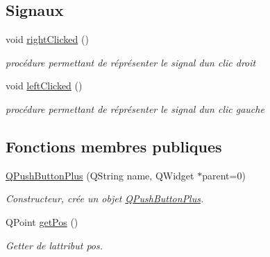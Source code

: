 \subsection*{Signaux}
\begin{DoxyCompactItemize}
\item 
void \hyperlink{class_q_push_button_plus_a8c120f8c9b33c2cd0d6282bc570559f3}{right\+Clicked} ()\hypertarget{class_q_push_button_plus_a8c120f8c9b33c2cd0d6282bc570559f3}{}\label{class_q_push_button_plus_a8c120f8c9b33c2cd0d6282bc570559f3}

\begin{DoxyCompactList}\small\item\em procédure permettant de réprésenter le signal d\textquotesingle{}un clic droit \end{DoxyCompactList}\item 
void \hyperlink{class_q_push_button_plus_a97c13206b568d3e4e83d7191703b9bab}{left\+Clicked} ()\hypertarget{class_q_push_button_plus_a97c13206b568d3e4e83d7191703b9bab}{}\label{class_q_push_button_plus_a97c13206b568d3e4e83d7191703b9bab}

\begin{DoxyCompactList}\small\item\em procédure permettant de réprésenter le signal d\textquotesingle{}un clic gauche \end{DoxyCompactList}\end{DoxyCompactItemize}
\subsection*{Fonctions membres publiques}
\begin{DoxyCompactItemize}
\item 
\hyperlink{class_q_push_button_plus_a0e4bf0e820b7401bb99cc7eb1d5b96b9}{Q\+Push\+Button\+Plus} (Q\+String name, Q\+Widget $\ast$parent=0)
\begin{DoxyCompactList}\small\item\em Constructeur, crée un objet \hyperlink{class_q_push_button_plus}{Q\+Push\+Button\+Plus}. \end{DoxyCompactList}\item 
Q\+Point \hyperlink{class_q_push_button_plus_a902660536c4021ac2bbbc2f5cca34301}{get\+Pos} ()
\begin{DoxyCompactList}\small\item\em Getter de l\textquotesingle{}attribut pos. \end{DoxyCompactList}\end{DoxyCompactItemize}


